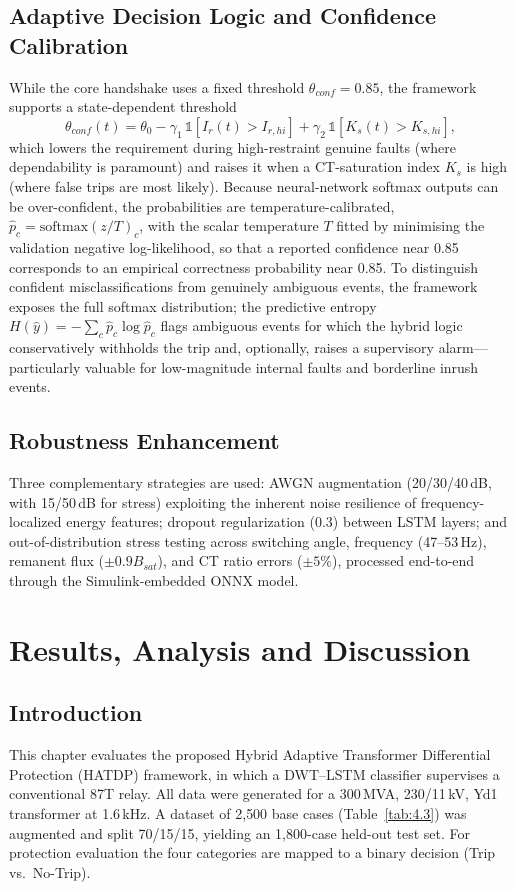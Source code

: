 \documentclass[12pt,a4paper,oneside]{report}
\begin{document}
\section{Adaptive Decision Logic and Confidence Calibration}
While the core handshake uses a fixed threshold $\theta_{conf}=0.85$, the framework supports a state-dependent threshold
\begin{equation}
\theta_{conf}(t)=\theta_0-\gamma_1\,\mathbb{1}[I_r(t)>I_{r,hi}]+\gamma_2\,\mathbb{1}[K_s(t)>K_{s,hi}],
\end{equation}
which lowers the requirement during high-restraint genuine faults (where dependability is paramount) and raises it when a CT-saturation index $K_s$ is high (where false trips are most likely). Because neural-network softmax outputs can be over-confident, the probabilities are temperature-calibrated, $\hat{p}_c=\mathrm{softmax}(z/T)_c$, with the scalar temperature $T$ fitted by minimising the validation negative log-likelihood, so that a reported confidence near 0.85 corresponds to an empirical correctness probability near 0.85. To distinguish confident misclassifications from genuinely ambiguous events, the framework exposes the full softmax distribution; the predictive entropy $H(\hat{y})=-\sum_c\hat{p}_c\log\hat{p}_c$ flags ambiguous events for which the hybrid logic conservatively withholds the trip and, optionally, raises a supervisory alarm---particularly valuable for low-magnitude internal faults and borderline inrush events.

\section{Robustness Enhancement}
Three complementary strategies are used: AWGN augmentation (20/30/40\,dB, with 15/50\,dB for stress) exploiting the inherent noise resilience of frequency-localized energy features; dropout regularization (0.3) between LSTM layers; and out-of-distribution stress testing across switching angle, frequency (47--53\,Hz), remanent flux ($\pm0.9 B_{sat}$), and CT ratio errors ($\pm5\%$), processed end-to-end through the Simulink-embedded ONNX model.

\chapter{Results, Analysis and Discussion}
\section{Introduction}
This chapter evaluates the proposed Hybrid Adaptive Transformer Differential Protection (HATDP) framework, in which a DWT--LSTM classifier supervises a conventional 87T relay. All data were generated for a 300\,MVA, 230/11\,kV, Yd1 transformer at 1.6\,kHz. A dataset of 2{,}500 base cases (Table~\ref{tab:4.3}) was augmented and split 70/15/15, yielding an 1{,}800-case held-out test set. For protection evaluation the four categories are mapped to a binary decision (Trip vs.\ No-Trip).
\end{document}
